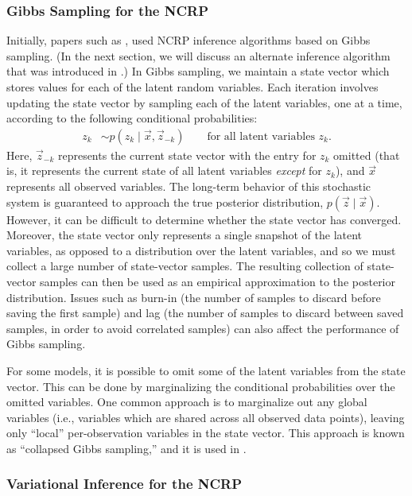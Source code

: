 \documentclass{article}
\begin{document}
\subsubsection{Gibbs Sampling for the NCRP}

Initially, papers such as \cite{griffiths2004hierarchical}, used NCRP inference algorithms based on Gibbs sampling.
(In the next section, we will discuss an alternate inference algorithm that was introduced in \cite{wang2009vi_ncrp}.)
In Gibbs sampling, we maintain a state vector which stores values for each of the latent random variables.
Each iteration involves updating the state vector by sampling each of the latent variables, one at a time, according to the following conditional probabilities:
\begin{align}
z_k &\sim p(z_k \mid \vec x, \vec z_{-k}) \qquad \text{for all latent variables $z_k$.}
\end{align}
Here, $\vec z_{-k}$ represents the current state vector with the entry for $z_k$ omitted (that is, it represents the current state of all latent variables \emph{except} for $z_k$), and $\vec x$ represents all observed variables.
The long-term behavior of this stochastic system is guaranteed to approach the true posterior distribution, $p(\vec z \mid \vec x)$.
However, it can be difficult to determine whether the state vector has converged.
Moreover, the state vector only represents a single snapshot of the latent variables, as opposed to a distribution over the latent variables, and so we must collect a large number of state-vector samples.
The resulting collection of state-vector samples can then be used as an empirical approximation to the posterior distribution.
Issues such as burn-in (the number of samples to discard before saving the first sample) and lag (the number of samples to discard between saved samples, in order to avoid correlated samples) can also affect the performance of Gibbs sampling.

For some models, it is possible to omit some of the latent variables from the state vector.
This can be done by marginalizing the conditional probabilities over the omitted variables.
One common approach is to marginalize out any global variables (i.e., variables which are shared across all observed data points), leaving only ``local'' per-observation variables in the state vector.
This approach is known as ``collapsed Gibbs sampling,'' and it is used in \cite{blei2010ncrp}.


\subsubsection{Variational Inference for the NCRP}
\end{document}
